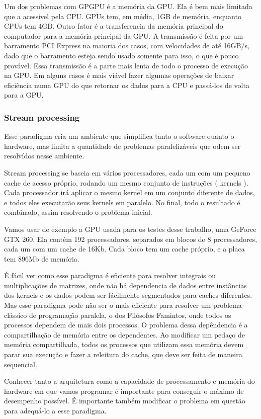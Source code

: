Um dos problemas com GPGPU é a memória da GPU. Ela é bem mais limitada que a acessivel pela CPU. GPUs tem, em média, 1GB
de memória, enquanto CPUs tem 4GB. Outro fator é a transferencia da memória principal do computador para a memória principal
da GPU. A transmissão é feita por um barramento PCI Express na maioria dos casos, com velocidades de até 16GB/s, dado que o
barramento esteja sendo usado somente para isso, o que é pouco provável. Essa transmissão é a parte mais lenta de todo o
processo de execução na GPU. Em alguns casos é mais viável fazer algumas operações de baixar eficiência numa GPU do que
retornar os dados para a CPU e passá-los de volta para a GPU.

\subsubsection{Stream processing}
Esse paradigma cria um ambiente que simplifica tanto o software quanto o hardware, mas limita a quantidade de problemas 
paralelizáveis que odem ser resolvídos nesse ambiente.

Stream processing se baseia em vários processadores, cada um com um pequeno cache de acesso próprio, 
rodando um mesmo conjunto de instruções ( kernels ). Cada processador irá aplicar o mesmo kernel em um
conjunto diferente de dados, e todos eles executarão seus kernels em paralelo. No final, todo o resultado é
combinado, assim resolvendo o problema inicial.

Vamos usar de exemplo a GPU usada para os testes desse trabalho, uma GeForce GTX 260. Ela contém
192 processadores, separados em blocos de 8 processadores, cada um com um cache de 16Kb. Cada bloco
tem um cache próprio, e a placa tem 896Mb de memória.

É fácil ver como esse paradigma é eficiente para resolver integrais ou multiplicações de matrizes, onde não há
dependencia de dados entre instâncias dos kernels e os dados podem ser fácilmente segmentados para caches diferentes.
Mas esse paradigma pode não ser o mais eficiente para resolver um problema clássico de programação paralela, o dos
Filósofos Famintos, onde todos os processos dependem de mais dois processos. O problema dessa depêndencia é a 
compartilhação de memória entre os dependentes. Ao modificar um pedaço de memória compartilhada, todos os processos 
que utilizam essa memória devem parar sua execução e fazer a releitura do cache, que deve ser feita de maneira sequencial.

Conhecer tanto a arquitetura como a capacidade de processamento e memória do hardware em que vamos programar é 
importante para conseguir o máximo de desempenho possível. É importante também modificar o problema em questão 
para adequá-lo a esse paradigma.

